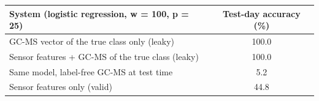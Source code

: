 \begin{tabular}{lc}
\toprule
\textbf{System (logistic regression, w = 100, p = 25)} & \textbf{Test-day accuracy (\%)} \\
\midrule
GC-MS vector of the true class only (leaky) & 100.0 \\
Sensor features + GC-MS of the true class (leaky) & 100.0 \\
Same model, label-free GC-MS at test time & 5.2 \\
Sensor features only (valid) & 44.8 \\
\bottomrule
\end{tabular}
